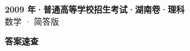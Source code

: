 \documentclass[zihao=-4, a4paper]{ctexart}
\begin{document}
\begin{center}
  {\Large\bfseries 2009 年·普通高等学校招生考试·湖南卷·理科}\\[4pt]
  {\large 数学 · 简答版}
\end{center}
\medskip
{}

\clearpage
{}
\begin{center}{\Large\bfseries 答案速查}\end{center}
\medskip

\end{document}
